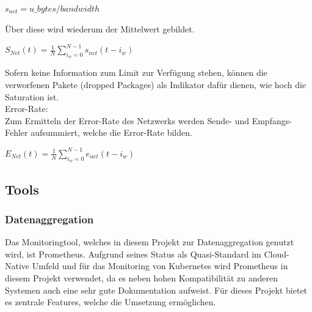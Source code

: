 \documentclass[a4paper,10pt]{scrartcl}
\begin{document}
\begin{description}
\begin{minipage}{\linewidth}
\(
\displaystyle{s_{net}=u\_bytes/bandwidth}
\) 
\end{minipage}

Über diese wird wiederum der Mittelwert gebildet.

\begin{minipage}{\linewidth}
\(
\displaystyle{S_{Net}(t)=\frac{1}{N}{\sum\limits_{i_{w}=0}^{N-1} s_{net}{(t-i_{w})}} }
\) 
\end{minipage}

Sofern keine Information zum Limit zur Verfügung stehen, können die verworfenen Pakete (dropped Packages) als Indikator dafür dienen, wie hoch die Saturation ist.\\

Error-Rate:\\
Zum Ermitteln der Error-Rate des Netzwerks werden Sende- und Empfangs-Fehler aufsummiert, welche die Error-Rate bilden.

\begin{minipage}{\linewidth}
\(
\displaystyle{E_{Net}(t)=\frac{1}{N}{\sum\limits_{i_{w}=0}^{N-1} e_{net}{(t-i_{w})}} }
\) 
\end{minipage}

\end{description}
\subsection{Tools}
\subsubsection{Datenaggregation}

Das Monitoringtool, welches in diesem Projekt zur Datenaggregation genutzt wird, ist Prometheus. Aufgrund seines Status als Quasi-Standard im Cloud-Native Umfeld und für das Monitoring von Kubernetes wird Prometheus in diesem Projekt verwendet, da es neben hohen Kompatibilität zu anderen Systemen auch eine sehr gute Dokumentation aufweist. Für dieses Projekt bietet es zentrale Features, welche die Umsetzung ermöglichen.
\end{document}
